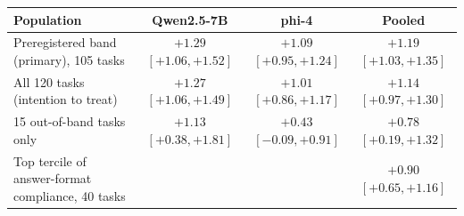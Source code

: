 \begin{tabular}{lccc}
\toprule
Population & Qwen2.5-7B & phi-4 & Pooled \\
\midrule
Preregistered band (primary), 105 tasks & $+1.29$ {\scriptsize$[+1.06,+1.52]$} & $+1.09$ {\scriptsize$[+0.95,+1.24]$} & $+1.19$ {\scriptsize$[+1.03,+1.35]$} \\
All 120 tasks (intention to treat) & $+1.27$ {\scriptsize$[+1.06,+1.49]$} & $+1.01$ {\scriptsize$[+0.86,+1.17]$} & $+1.14$ {\scriptsize$[+0.97,+1.30]$} \\
15 out-of-band tasks only & $+1.13$ {\scriptsize$[+0.38,+1.81]$} & $+0.43$ {\scriptsize$[-0.09,+0.91]$} & $+0.78$ {\scriptsize$[+0.19,+1.32]$} \\
Top tercile of answer-format compliance, 40 tasks & & & $+0.90$ {\scriptsize$[+0.65,+1.16]$} \\
\bottomrule
\end{tabular}
